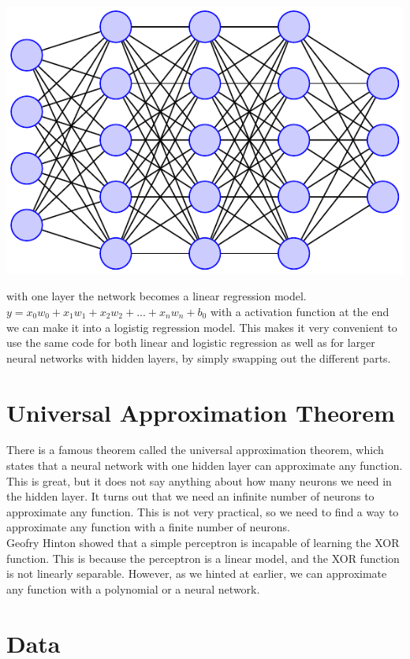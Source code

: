 \documentclass[twoside,11pt]{report}
\begin{document}
\includegraphics[width=\linewidth]{nn.pdf}

with one layer the network becomes a linear regression model. $y = x_0w_0 + x_1w_1 + x_2w_2 + ... + x_nw_n + b_0$ with a activation function at the end we can make it into a logistig regression model.
This makes it very convenient to use the same code for both linear and logistic regression as well as for 
larger neural networks with hidden layers, by simply swapping out the different parts.


\section{ Universal Approximation Theorem }
\label{sec:UAT}

There is a famous theorem called the universal approximation theorem, which states that a neural network with one hidden
layer can approximate any function. This is great, but it does not say anything about how many neurons we need in the
hidden layer. It turns out that we need an infinite number of neurons to approximate any function. This is not very
practical, so we need to find a way to approximate any function with a finite number of neurons.\\

Geofry Hinton showed that a simple perceptron is incapable of learning the XOR function. 
This is because the perceptron is a linear model, and the XOR function is not linearly separable. 
However, as we hinted at earlier, we can approximate any function with a polynomial or a neural network.


\section{Data}
\label{sec:data}
\end{document}
